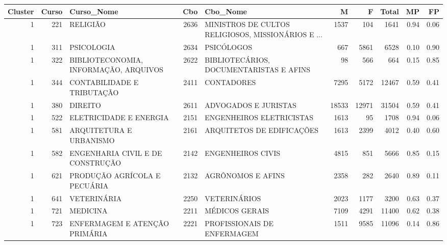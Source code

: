 \begin{tabular}{rrlrlrrrrr}
\toprule
 Cluster &  Curso &                            Curso\_Nome &  Cbo &                                           Cbo\_Nome &     M &     F &  Total &   MP &   FP \\
\midrule
       1 &    221 &                              RELIGIÃO & 2636 & MINISTROS DE CULTOS RELIGIOSOS, MISSIONÁRIOS E ... &  1537 &   104 &   1641 & 0.94 & 0.06 \\
       1 &    311 &                            PSICOLOGIA & 2634 &                                         PSICÓLOGOS &   667 &  5861 &   6528 & 0.10 & 0.90 \\
       1 &    322 & BIBLIOTECONOMIA, INFORMAÇÃO, ARQUIVOS & 2622 &            BIBLIOTECÁRIOS, DOCUMENTARISTAS E AFINS &    98 &   566 &    664 & 0.15 & 0.85 \\
       1 &    344 &            CONTABILIDADE E TRIBUTAÇÃO & 2411 &                                         CONTADORES &  7295 &  5172 &  12467 & 0.59 & 0.41 \\
       1 &    380 &                               DIREITO & 2611 &                               ADVOGADOS E JURISTAS & 18533 & 12971 &  31504 & 0.59 & 0.41 \\
       1 &    522 &                ELETRICIDADE E ENERGIA & 2151 &                           ENGENHEIROS ELETRICISTAS &  1613 &    95 &   1708 & 0.94 & 0.06 \\
       1 &    581 &               ARQUITETURA E URBANISMO & 2161 &                          ARQUITETOS DE EDIFICAÇÕES &  1613 &  2399 &   4012 & 0.40 & 0.60 \\
       1 &    582 &      ENGENHARIA CIVIL E DE CONSTRUÇÃO & 2142 &                                 ENGENHEIROS CIVIS  &  4815 &   851 &   5666 & 0.85 & 0.15 \\
       1 &    621 &          PRODUÇÃO AGRÍCOLA E PECUÁRIA & 2132 &                                  AGRÔNOMOS E AFINS &  2358 &   282 &   2640 & 0.89 & 0.11 \\
       1 &    641 &                           VETERINÁRIA & 2250 &                                       VETERINÁRIOS &  2023 &  1177 &   3200 & 0.63 & 0.37 \\
       1 &    721 &                              MEDICINA & 2211 &                                     MÉDICOS GERAIS &  7109 &  4291 &  11400 & 0.62 & 0.38 \\
       1 &    723 &         ENFERMAGEM E ATENÇÃO PRIMÁRIA & 2221 &                       PROFISSIONAIS DE ENFERMAGEM  &  1511 &  9585 &  11096 & 0.14 & 0.86 \\

\end{tabular}
